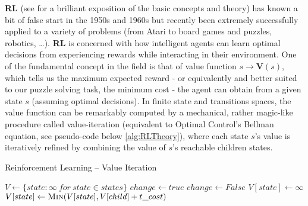 

\label{sec:RLTheory}

\textbf{RL} (see \cite{Sutton1998} for a brilliant exposition of the basic concepts and theory) has known a bit of false start in the 1950s and 1960s but recently been extremely successfully applied to a variety of problems (from Atari to board games and puzzles, robotics, \dots). \textbf{RL} is concerned with how intelligent agents can learn optimal decisions from experiencing rewards while interacting in their environment. One of the fundamental concept in the field is that of value function $s \to \textbf{V}(s)$, which tells us the maximum expected reward - or equivalently and better suited to our puzzle solving task, the minimum cost - the agent can obtain from a given state $s$ (assuming optimal decisions). In finite state and transitions spaces, the value function can be remarkably computed by a mechanical, rather magic-like procedure called value-iteration (equivalent to Optimal Control's Bellman equation, see pseudo-code below \ref{alg:RLTheory}), where each state $s$'s value is iteratively refined by combining the value of $s$'s reachable children states.


\teal
\begin{algorithm}[H]
\caption{Reinforcement Learning -- Value Iteration}\label{alg:RLTheory}
\begin{algorithmic}
 \teal {} \black
\State $V \gets \{state: \infty \ for \ state \in states\}$
\State $change \gets true$
\State $change \gets False$
	\State $V[state] \gets \infty$
	\State $V[state] \gets \Call{Min}{V[state], V[child] + t\_cost}$
	\EndFor
	\EndIf
\EndFor
\EndWhile
{}
\EndFunction
\end{algorithmic}
\end{algorithm}
\black






